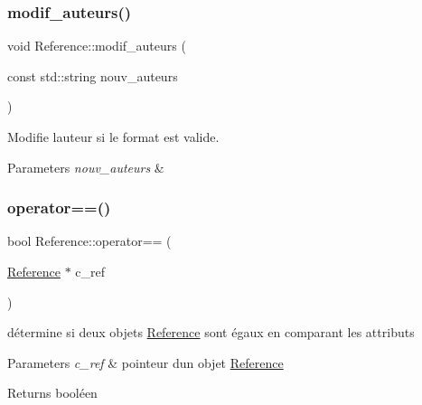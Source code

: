 \subsubsection{\texorpdfstring{modif\+\_\+auteurs()}{modif\_auteurs()}}
{\footnotesize\ttfamily void Reference\+::modif\+\_\+auteurs (\begin{DoxyParamCaption}\item[{const std\+::string}]{nouv\+\_\+auteurs }\end{DoxyParamCaption})}



Modifie l\textquotesingle{}auteur si le format est valide. 


\begin{DoxyParams}{Parameters}
{\em nouv\+\_\+auteurs} & \\
\hline
\end{DoxyParams}
\mbox{\label{classbiblio_1_1Reference_a37fde155612f4a9cc58fa3d6a125e024}} 
\subsubsection{\texorpdfstring{operator==()}{operator==()}}
{\footnotesize\ttfamily bool Reference\+::operator== (\begin{DoxyParamCaption}\item[{\hyperlink{classbiblio_1_1Reference}{Reference} $\ast$}]{c\+\_\+ref }\end{DoxyParamCaption})}



détermine si deux objets \hyperlink{classbiblio_1_1Reference}{Reference} sont égaux en comparant les attributs 


\begin{DoxyParams}{Parameters}
{\em c\+\_\+ref} & pointeur d\textquotesingle{}un objet \hyperlink{classbiblio_1_1Reference}{Reference} \\
\hline
\end{DoxyParams}
\begin{DoxyReturn}{Returns}
booléen 
\end{DoxyReturn}
\mbox{\label{classbiblio_1_1Reference_adcf4b47dfbd090e0da711a3167aaf7ab}} 
